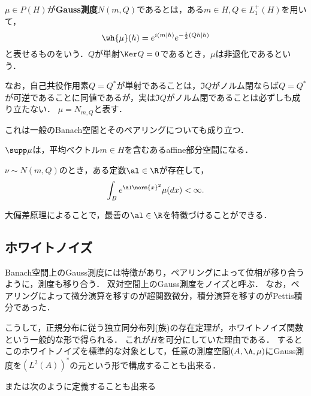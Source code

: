 \documentclass[uplatex,dvipdfmx]{jsreport}
\begin{document}
\begin{definition}
    $\mu\in P(H)$が\textbf{Gauss測度$N(m,Q)$}であるとは，ある$m\in H,Q\in L^+_1(H)$を用いて，
    \[\wh{\mu}(h)=e^{i(m|h)}e^{-\frac{1}{2}(Qh|h)}\]
    と表せるものをいう．$Q$が単射$\Ker Q=0$であるとき，$\mu$は非退化であるという．

    なお，自己共役作用素$Q=Q^*$が単射であることは，$\Im Q$がノルム閉ならば$Q=Q^*$が可逆であることに同値であるが，実は$\Im Q$がノルム閉であることは必ずしも成り立たない．
    $\mu=N_{m,Q}$と表す．
\end{definition}
\begin{remarks}
    これは一般のBanach空間とそのペアリングについても成り立つ．
\end{remarks}

\begin{theorem}
    $\supp\mu$は，平均ベクトル$m\in H$を含むあるaffine部分空間になる．
\end{theorem}

\begin{theorem}[Fernique]
    $\nu\sim N(m,Q)$のとき，ある定数$\al\in\R$が存在して，
    \[\int_Be^{\al\norm{x}^2}\mu(dx)<\infty.\]
\end{theorem}
\begin{remark}
    大偏差原理によることで，最善の$\al\in\R$を特徴づけることができる．
\end{remark}

\subsection{ホワイトノイズ}

\begin{tcolorbox}[colframe=ForestGreen, colback=ForestGreen!10!white,breakable,colbacktitle=ForestGreen!40!white,coltitle=black,fonttitle=\bfseries\sffamily,
title=]
    Banach空間上のGauss測度には特徴があり，ペアリングによって位相が移り合うように，測度も移り合う．
    双対空間上のGauss測度をノイズと呼ぶ．
    なお，ペアリングによって微分演算を移すのが超関数微分，積分演算を移すのがPettis積分であった．

    こうして，正規分布に従う独立同分布列(族)の存在定理が，ホワイトノイズ関数という一般的な形で得られる．
    これが$H$を可分にしていた理由である．
    するとこのホワイトノイズを標準的な対象として，任意の測度空間$(A,\A,\mu)$にGauss測度を$(L^2(A))^*$の元という形で構成することも出来る．
\end{tcolorbox}

または次のように定義することも出来る\cite{Revuz-Yor}
\end{document}
